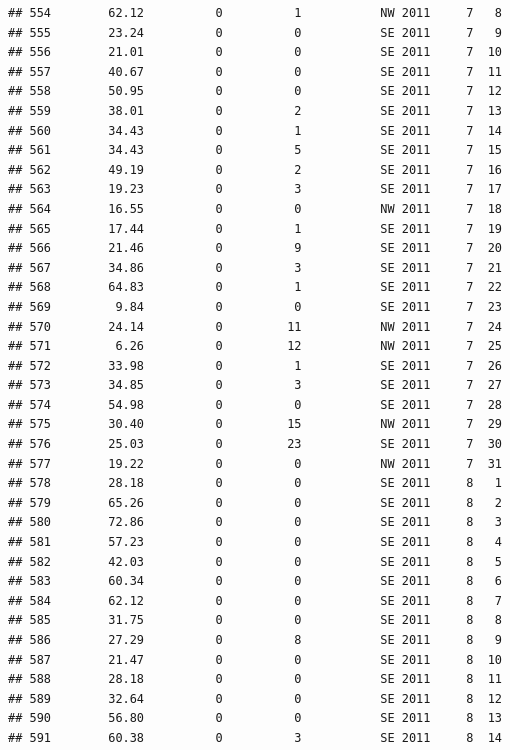 \documentclass[
]{article}
\begin{document}
\begin{verbatim}
## 554        62.12          0          1           NW 2011     7   8
## 555        23.24          0          0           SE 2011     7   9
## 556        21.01          0          0           SE 2011     7  10
## 557        40.67          0          0           SE 2011     7  11
## 558        50.95          0          0           SE 2011     7  12
## 559        38.01          0          2           SE 2011     7  13
## 560        34.43          0          1           SE 2011     7  14
## 561        34.43          0          5           SE 2011     7  15
## 562        49.19          0          2           SE 2011     7  16
## 563        19.23          0          3           SE 2011     7  17
## 564        16.55          0          0           NW 2011     7  18
## 565        17.44          0          1           SE 2011     7  19
## 566        21.46          0          9           SE 2011     7  20
## 567        34.86          0          3           SE 2011     7  21
## 568        64.83          0          1           SE 2011     7  22
## 569         9.84          0          0           SE 2011     7  23
## 570        24.14          0         11           NW 2011     7  24
## 571         6.26          0         12           NW 2011     7  25
## 572        33.98          0          1           SE 2011     7  26
## 573        34.85          0          3           SE 2011     7  27
## 574        54.98          0          0           SE 2011     7  28
## 575        30.40          0         15           NW 2011     7  29
## 576        25.03          0         23           SE 2011     7  30
## 577        19.22          0          0           NW 2011     7  31
## 578        28.18          0          0           SE 2011     8   1
## 579        65.26          0          0           SE 2011     8   2
## 580        72.86          0          0           SE 2011     8   3
## 581        57.23          0          0           SE 2011     8   4
## 582        42.03          0          0           SE 2011     8   5
## 583        60.34          0          0           SE 2011     8   6
## 584        62.12          0          0           SE 2011     8   7
## 585        31.75          0          0           SE 2011     8   8
## 586        27.29          0          8           SE 2011     8   9
## 587        21.47          0          0           SE 2011     8  10
## 588        28.18          0          0           SE 2011     8  11
## 589        32.64          0          0           SE 2011     8  12
## 590        56.80          0          0           SE 2011     8  13
## 591        60.38          0          3           SE 2011     8  14

\end{verbatim}
\end{document}

